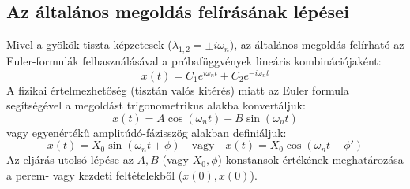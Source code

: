 \subsection*{Az általános megoldás felírásának lépései}
Mivel a gyökök tiszta képzetesek ($\lambda_{1,2} = \pm i \omega_n$), az általános megoldás felírható az Euler-formulák felhasználásával a próbafüggvények lineáris kombinációjaként:
\begin{equation}
    x(t) = C_1 e^{i\omega_n t} + C_2 e^{-i\omega_n t}
\end{equation}
A fizikai értelmezhetőség (tisztán valós kitérés) miatt az Euler formula segítségével a megoldást trigonometrikus alakba konvertáljuk:
\begin{equation}
    x(t) = A \cos(\omega_n t) + B \sin(\omega_n t)
\end{equation}
vagy egyenértékű amplitúdó-fázisszög alakban definiáljuk:
\begin{equation}
    x(t) = X_0 \sin(\omega_n t + \phi) \quad \text{vagy} \quad x(t) = X_0 \cos(\omega_n t - \phi')
\end{equation}
Az eljárás utolsó lépése az $A, B$ (vagy $X_0, \phi$) konstansok értékének meghatározása a perem- vagy kezdeti feltételekből ($x(0), \dot{x}(0)$).
